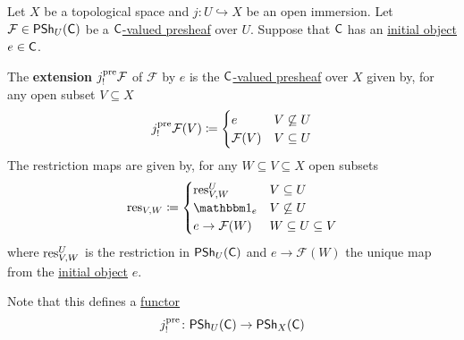 \documentclass[../../main]{subfiles}
\begin{document}
\begin{definition}\label{def:extension-by-zero-presheaf}
  Let \(X\) be a topological space and \(j\colon U \hookrightarrow X\) be an open immersion.
  Let \(\mathcal{F} \in \mathsf{PSh}_{U}(\mathsf{C})\) be a \hyperref[def:presheaf]{\(\mathsf{C}\)-valued presheaf} over \(U\).
  Suppose that \(\mathsf{C}\) has an \hyperref[def:initial-terminal-object]{initial object} \(e \in \mathsf{C}\).

  The \textbf{extension} \(j_{!}^{\operatorname*{pre}} \mathcal{F}\) of \(\mathcal{F}\) by \(e\) is the \hyperref[def:presheaf]{\(\mathsf{C}\)-valued presheaf} over \(X\) given by, for any open subset \(V \subseteq X\)
  \begin{equation*}
    j_{!}^{\operatorname*{pre}} \mathcal{F}(V) \coloneq \begin{cases}
      e & V \not\subseteq U \\
      \mathcal{F}(V) & V \subseteq U
    \end{cases}
  \end{equation*}
  The restriction maps are given by, for any \(W \subseteq V \subseteq X\) open subsets
  \begin{equation*}
    \res_{V, W} \coloneq \begin{cases}
      \res_{V, W}^{U} & V \subseteq U \\
      \id_{e} & V \not\subseteq U \\
      e \to \mathcal{F}(W) & W \subseteq U \subseteq V
    \end{cases}
  \end{equation*}
  where \(\operatorname{res}_{V, W}^{U}\) is the restriction in \(\mathsf{PSh}_{U}(\mathsf{C})\) and \(e \to \mathcal{F}(W)\) the unique map from the \hyperref[def:initial-terminal-object]{initial object} \(e\).
  
  Note that this defines a \hyperref[def:functor]{functor}
  \begin{equation*}
    j_{!}^{\operatorname*{pre}}\colon \mathsf{PSh}_{U}(\mathsf{C}) \to \mathsf{PSh}_{X}(\mathsf{C})
  \end{equation*}
\end{definition}
\end{document}
